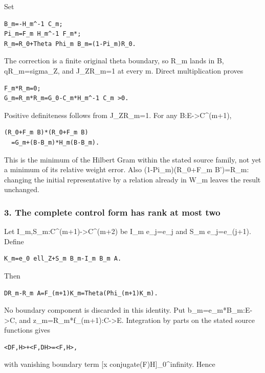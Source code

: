 Set

\begin{verbatim}
B_m=-H_m^-1 C_m;
Pi_m=F_m H_m^-1 F_m*;
R_m=R_0+Theta Phi_m B_m=(1-Pi_m)R_0.
\end{verbatim}

The correction is a finite original theta boundary, so R\_m lands in B, qR\_m=sigma\_Z, and
J\_ZR\_m=1 at every m. Direct multiplication proves

\begin{verbatim}
F_m*R_m=0;
G_m=R_m*R_m=G_0-C_m*H_m^-1 C_m >0.
\end{verbatim}

Positive definiteness follows from J\_ZR\_m=1. For any B:E-\textgreater C\^{}(m+1),

\begin{verbatim}
(R_0+F_m B)*(R_0+F_m B)
  =G_m+(B-B_m)*H_m(B-B_m).
\end{verbatim}

This is the minimum of the Hilbert Gram within the stated source family, not yet a minimum of its
relative weight error. Also (1-Pi\_m)(R\_0+F\_m B')=R\_m: changing the initial representative by a
relation already in W\_m leaves the result unchanged.

\subsubsection{3. The complete control form has rank at most
two}\label{pr_13:the-complete-control-form-has-rank-at-most-two}

Let I\_m,S\_m:C\^{}(m+1)-\textgreater C\^{}(m+2) be I\_m e\_j=e\_j and S\_m e\_j=e\_(j+1). Define

\begin{verbatim}
K_m=e_0 ell_Z+S_m B_m-I_m B_m A.
\end{verbatim}

Then

\begin{verbatim}
DR_m-R_m A=F_(m+1)K_m=Theta(Phi_(m+1)K_m).
\end{verbatim}

No boundary component is discarded in this identity. Put b\_m=e\_m*B\_m:E-\textgreater C, and
z\_m=R\_m*f\_(m+1):C-\textgreater E. Integration by parts on the stated source functions gives

\begin{verbatim}
<DF,H>+<F,DH>=<F,H>,
\end{verbatim}

with vanishing boundary term {[}x conjugate(F)H{]}\_0\^{}infinity. Hence

